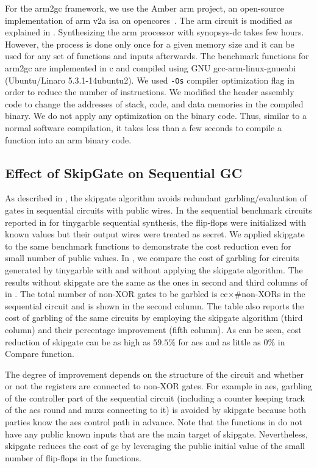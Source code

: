 For the \gls{arm2gc} framework, we use the Amber \gls{arm} project, an open-source implementation of \gls{arm} v2a \acrshort{isa} on opencores~\cite{santifort2010amber}.
The \gls{arm} circuit is modified as explained in .
Synthesizing the \gls{arm} processor with \gls{synopsys-dc} takes few hours.
However, the process is done only once for a given memory size and it can be used for any set of functions and inputs afterwards.
The benchmark functions for \gls{arm2gc} are implemented in \gls{c} and compiled using GNU gcc-arm-linux-gnueabi (Ubuntu/Linaro 5.3.1-14ubuntu2).
We used \texttt{-Os} compiler optimization flag in order to reduce the number of instructions.
We modified the header assembly code to change the addresses of stack, code, and data memories in the compiled binary.
We do not apply any optimization on the binary code.
Thus, similar to a normal software compilation, it takes less than a few seconds to compile a function into an \gls{arm} binary code.

\subsection{Effect of {SkipGate} on Sequential GC}
As described in , the \gls{skipgate} algorithm avoids redundant garbling/evaluation of gates in sequential circuits with public wires.
In the sequential benchmark circuits reported in  for \gls{tinygarble} sequential synthesis, the flip-flops were initialized with known values but their output wires were treated as secret.
We applied \gls{skipgate} to the same benchmark functions to demonstrate the cost reduction even for small number of public values.
In , we compare the cost of garbling for circuits generated by \gls{tinygarble} with and without applying the \gls{skipgate} algorithm.
The results without \gls{skipgate} are the same as the ones in second and third columns of  in .
The total number of non-XOR gates to be garbled is cc$\times$\#non-XORs in the sequential circuit and is shown in the second column.
The table also reports the cost of garbling of the same circuits by employing the \gls{skipgate} algorithm (third column) and their percentage improvement (fifth column).
As can be seen, cost reduction of \gls{skipgate} can be as high as $59.5\%$ for \acrshort{aes} and as little as $0\%$ in Compare function.

The degree of improvement depends on the structure of the circuit and whether or not the registers are connected to non-XOR gates.
For example in \acrshort{aes}, garbling of the controller part of the sequential circuit (including a counter keeping track of the \acrshort{aes} round and \acrshort{mux}s connecting to it) is avoided by \gls{skipgate} because both parties know the \acrshort{aes} control path in advance.
Note that the functions in  do not have any public known inputs that are the main target of \gls{skipgate}.
Nevertheless, \gls{skipgate} reduces the cost of \acrshort{gc} by leveraging the public initial value of the small number of flip-flops in the functions.


